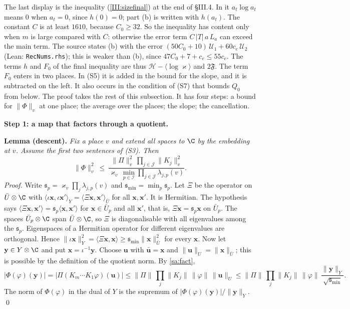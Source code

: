 \documentclass[11pt,letterpaper]{article}
\begin{document}
The last display is the inequality (\ref{III:sizefinal}) at the end of \S III.4. In it
$a_t\log a_t$ means $0$ when $a_t=0$, since $h(0)=0$; part (b) is written with $h(a_t)$. The constant $C$
is at least $1610$, because $C_0\ge32$. So the inequality has content only when $m$ is large compared
with $C$: otherwise the error term $C\,|T|\,a\,L_a$ can exceed the main term. The source states (b) with the
error $(50C_0+10)\,\mathcal U_1+60c_e\,\mathcal U_2$ (Lean: \texttt{RecNums.rhs}); this is weaker than
(b), since $47C_0+7+c_e\le55c_e$. The terms $h$ and $F_0$ of the final inequality are thus
$\mathcal H-\langle\log\varkappa\rangle$ and $2\mathfrak F$. The term $F_0$ enters in two places. In
(S5) it is added in the bound for the slope, and it is subtracted on the left. It also occurs in the
condition of (S7) that bounds $Q_0$ from below. The proof takes the rest of this subsection. It has four
steps: a bound for $\|\Phi\|_v$ at one place; the average over the places; the slope; the cancellation.

\medskip
\noindent\textbf{Step 1: a map that factors through a quotient.}

\textbf{Lemma (descent).} \emph{Fix a place $v$ and extend all spaces to $\C$ by the embedding at $v$.
Assume the first two sentences of \textup{(S3)}. Then}
\begin{equation}\label{D:265}
 \|\Phi\|_v^2\ \le\ \frac{\|\Pi\|_v^2\,\prod_{j\in\mathcal J}\|K_j\|_v^2}
 {\varkappa_v\,\min_{p\in\mathcal I}\prod_{j\in\mathcal J}\lambda_{j,p}(v)} .
\end{equation}
\emph{Proof.} Write $\mathfrak s_p=\varkappa_v\prod_j\lambda_{j,p}(v)$ and
$\mathfrak s_{\min}=\min_p\mathfrak s_p$. Let $\Xi$ be the operator on $\bar U\otimes\C$ with
$\langle\iota\mathbf x,\iota\mathbf x'\rangle_Y=\langle\Xi\mathbf x,\mathbf x'\rangle_{\bar U}$ for all
$\mathbf x,\mathbf x'$. It is Hermitian. The hypothesis says
$\langle\Xi\mathbf x,\mathbf x'\rangle=\mathfrak s_p\langle\mathbf x,\mathbf x'\rangle$ for
$\mathbf x\in\bar U_p$ and all $\mathbf x'$, that is, $\Xi\mathbf x=\mathfrak s_p\mathbf x$ on $\bar U_p$.
The spaces $\bar U_p\otimes\C$ span $\bar U\otimes\C$, so $\Xi$ is diagonalisable with all eigenvalues
among the $\mathfrak s_p$. Eigenspaces of a Hermitian operator for different eigenvalues are orthogonal.
Hence $\|\iota\mathbf x\|_Y^2=\langle\Xi\mathbf x,\mathbf x\rangle\ge\mathfrak s_{\min}\|\mathbf x\|_{\bar U}^2$
for every $\mathbf x$. Now let $\mathbf y\in Y\otimes\C$ and put $\mathbf x=\iota^{-1}\mathbf y$. Choose
$\mathbf u$ with $\bar{\mathbf u}=\mathbf x$ and $\|\mathbf u\|_U=\|\mathbf x\|_{\bar U}$; this is
possible by the definition of the quotient norm. By \eqref{sa:fact},
\begin{equation}\label{D:266}
 |\Phi(\varphi)(\mathbf y)|=\big|\Pi(K_m\cdots K_1\varphi)(\mathbf u)\big|
 \le\|\Pi\|\,\prod_j\|K_j\|\,\|\varphi\|\,\|\mathbf u\|_U
 \le\|\Pi\|\,\prod_j\|K_j\|\,\|\varphi\|\,\frac{\|\mathbf y\|_Y}{\sqrt{\mathfrak s_{\min}}} .
\end{equation}
The norm of $\Phi(\varphi)$ in the dual of $Y$ is the supremum of
$|\Phi(\varphi)(\mathbf y)|/\|\mathbf y\|_Y$. \qed
\end{document}
